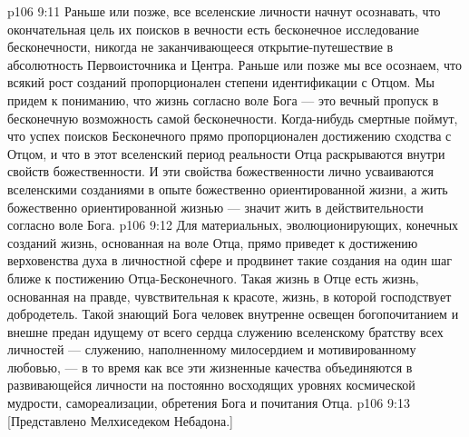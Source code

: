 \vs p106 9:11 \pc Раньше или позже, все вселенские личности начнут осознавать, что окончательная цель их поисков в вечности есть бесконечное исследование бесконечности, никогда не заканчивающееся открытие\hyp{}путешествие в абсолютность Первоисточника и Центра. Раньше или позже мы все осознаем, что всякий рост созданий пропорционален степени идентификации с Отцом. Мы придем к пониманию, что жизнь согласно воле Бога --- это вечный пропуск в бесконечную возможность самой бесконечности. Когда\hyp{}нибудь смертные поймут, что успех поисков Бесконечного прямо пропорционален достижению сходства с Отцом, и что в этот вселенский период реальности Отца раскрываются внутри свойств божественности. И эти свойства божественности лично усваиваются вселенскими созданиями в опыте божественно ориентированной жизни, а жить божественно ориентированной жизнью --- значит жить в действительности согласно воле Бога.
\vs p106 9:12 Для материальных, эволюционирующих, конечных созданий жизнь, основанная на воле Отца, прямо приведет к достижению верховенства духа в личностной сфере и продвинет такие создания на один шаг ближе к постижению Отца\hyp{}Бесконечного. Такая жизнь в Отце есть жизнь, основанная на правде, чувствительная к красоте, жизнь, в которой господствует добродетель. Такой знающий Бога человек внутренне освещен богопочитанием и внешне предан идущему от всего сердца служению вселенскому братству всех личностей --- служению, наполненному милосердием и мотивированному любовью, --- в то время как все эти жизненные качества объединяются в развивающейся личности на постоянно восходящих уровнях космической мудрости, самореализации, обретения Бога и почитания Отца.
\vsetoff
\vs p106 9:13 [Представлено Мелхиседеком Небадона.]
